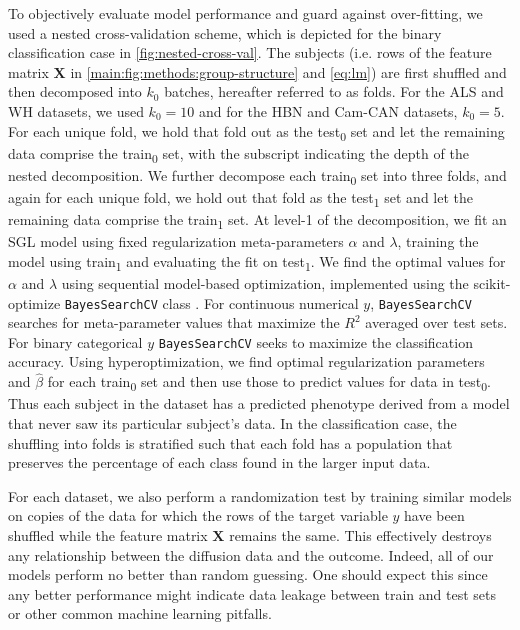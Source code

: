 \documentclass[10pt,%
               aps,%
               prl,%
               reprint,%
               superscriptaddress,%
               preprintnumbers,%
               linenumbers,%
               amsmath,%
               floatfix]{revtex4-2}
\begin{document}
To objectively evaluate model performance and guard against over-fitting,
we used a nested cross-validation scheme, which is depicted for the binary
classification case in \cref{fig:nested-cross-val}. The subjects (i.e. rows
of the feature matrix $\mathbf{X}$ in \cref{main:fig:methods:group-structure}
and \cref{eq:lm}) are first shuffled and then decomposed into $k_0$ batches,
hereafter referred to as folds. For the ALS and WH datasets, we used $k_0 =
10$ and for the HBN and Cam-CAN datasets, $k_0 = 5$. For each unique fold, we
hold that fold out as the test\textsubscript{0} set and let the remaining
data comprise the train\textsubscript{0} set, with the subscript indicating
the depth of the nested decomposition. We further decompose each
train\textsubscript{0} set into three folds, and again for each unique fold,
we hold out that fold as the test\textsubscript{1} set and let the remaining
data comprise the train\textsubscript{1} set. At level-1 of the
decomposition, we fit an SGL model using fixed regularization meta-parameters
$\alpha$ and $\lambda$, training the model using train\textsubscript{1} and
evaluating the fit on test\textsubscript{1}. We find the optimal values for
$\alpha$ and $\lambda$ using sequential model-based optimization, implemented
using the scikit-optimize \verb|BayesSearchCV| class \cite{scikit_optimize}.
For continuous numerical $y$, \verb|BayesSearchCV| searches for
meta-parameter values that maximize the $R^2$ averaged over test sets. For
binary categorical $y$ \verb|BayesSearchCV| seeks to maximize the
classification accuracy. Using hyperoptimization, we find optimal
regularization parameters and $\hat{\beta}$ for each train\textsubscript{0}
set and then use those to predict values for data in test\textsubscript{0}.
Thus each subject in the dataset has a predicted phenotype derived from a
model that never saw its particular subject's data. In the classification
case, the shuffling into folds is stratified such that each fold has a
population that preserves the percentage of each class found in the larger
input data.

For each dataset, we also perform a randomization test by training similar
models on copies of the data for which the rows of the target variable $y$
have been shuffled while the feature matrix $\mathbf{X}$ remains the same.
This effectively destroys any relationship between the diffusion data and the
outcome. Indeed, all of our models perform no better than random guessing.
One should expect this since any better performance might indicate data
leakage between train and test sets \cite{kaufman2012leakage} or other common
machine learning pitfalls.
\end{document}
